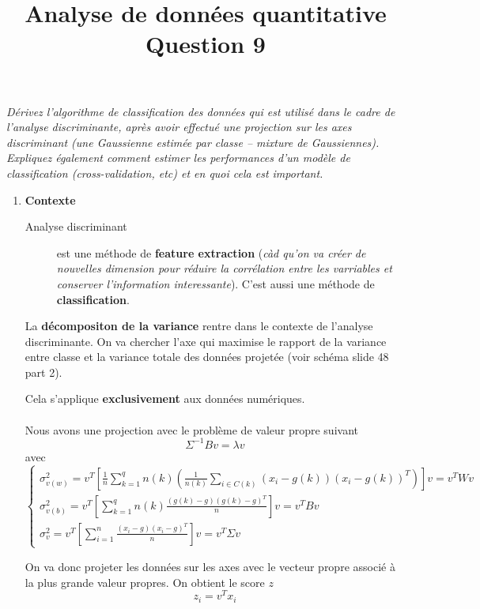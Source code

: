 \documentclass[a4paper, 11pt, onecolumn]{article}
\title{Analyse de données quantitative\\Question 9}
\date{}
\begin{document}
\maketitle

\textit{Dérivez l’algorithme de classification des données qui est utilisé dans le cadre de l’analyse discriminante, après avoir effectué une projection sur les axes discriminant (une Gaussienne estimée par classe – mixture de Gaussiennes). Expliquez également comment estimer les performances d’un modèle de classification (cross-validation, etc) et en quoi cela est important.}

\begin{enumerate}
\item \textbf{Contexte}

  \begin{description}
    \item[Analyse discriminant] est une méthode de \textbf{feature extraction} (\textit{càd qu'on va créer de nouvelles
      dimension pour réduire la corrélation entre les varriables et conserver l'information interessante}).
      C'est aussi une méthode de \textbf{classification}.
  \end{description}

  La \textbf{décompositon de la variance} rentre dans le contexte de l'analyse discriminante.
On va chercher l'axe qui maximise le rapport de la variance entre classe et la variance totale des données projetée (voir schéma slide 48 part 2).
 

  \danger Cela s'applique \textbf{exclusivement} aux données numériques. 

  \paragraph{}
Nous avons une projection avec le problème de valeur propre suivant
$$\Sigma^{-1}Bv = \lambda v$$
avec
$$
\left\{
\begin{array}{l}
\sigma_{v(w)}^2=v^T\left[\frac{1}{n}\sum_{k=1}^qn(k)\left(\frac{1}{n(k)}\sum_{i\in C(k)}(x_i-g(k))(x_i-g(k))^T\right)\right]v=v^TWv\\
\sigma_{v(b)}^2=v^T\left[\sum_{k=1}^qn(k)\frac{(g(k)-g)(g(k)-g)^T}{n}\right]v=v^TBv\\
\sigma_v^2=v^T\left[\sum_{i=1}^n\frac{(x_i-g)(x_i-g)^T}{n}\right]v=v^T\Sigma v
\end{array}
\right.
$$

On va donc projeter les données sur les axes avec le vecteur propre associé à la plus grande valeur propres. On obtient le score $z$
$$z_i=v^Tx_i$$


\end{enumerate}
\end{document}
